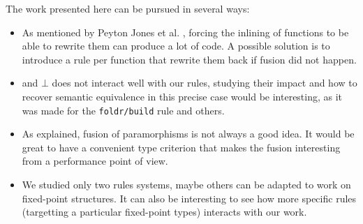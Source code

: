 
The work presented here can be pursued in several ways: 
\begin{itemize}
\item As mentioned by Peyton Jones et al. \cite{pbr}, forcing the inlining of functions to be able to rewrite them can produce a lot of code. A possible solution is to introduce a rule per function that rewrite them back if fusion did not happen.

\item {} and $\bot$ does not interact well with our rules, studying their impact and how to recover semantic equivalence in this precise case would be interesting, as it was made for the \verb|foldr/build| rule and others.

\item As explained, fusion of paramorphisms is not always a good idea. It would be great to have a convenient type criterion that makes the fusion interesting from a performance point of view.

\item We studied only two rules systems, maybe others can be adapted to work on fixed-point structures. It can also be interesting to see how more specific rules (targetting a particular fixed-point types) interacts with our work.
\end{itemize}
